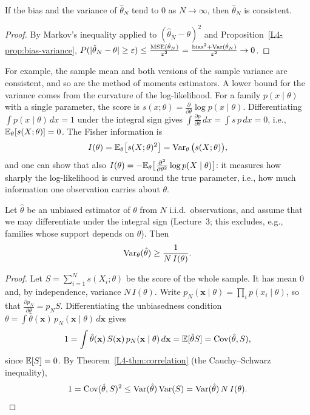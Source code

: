\begin{proposition}\label{L4-prop:consistency}
    If the bias and the variance of $\hat\theta_N$ tend to $0$ as $N \to \infty$, then $\hat\theta_N$ is consistent.
\end{proposition}

\begin{proof}
    By Markov's inequality applied to $(\hat\theta_N - \theta)^2$ and Proposition~\ref{L4-prop:bias-variance}, $P(|\hat\theta_N - \theta| \geq \varepsilon) \leq \frac{\mathrm{MSE}(\hat\theta_N)}{\varepsilon^2} = \frac{\text{bias}^2 + \operatorname{Var}(\hat\theta_N)}{\varepsilon^2} \to 0$.
\end{proof}

For example, the sample mean and both versions of the sample variance are consistent, and so are the method of moments estimators. A lower bound for the variance comes from the curvature of the log-likelihood. For a family $p(x \mid \theta)$ with a single parameter, the score is $s(x; \theta) = \frac{\partial}{\partial\theta}\log p(x \mid \theta)$. Differentiating $\int p(x \mid \theta)\, dx = 1$ under the integral sign gives $\int \frac{\partial p}{\partial\theta}\, dx = \int s\,p\, dx = 0$, i.e., $\mathbb{E}_\theta[s(X; \theta)] = 0$. The Fisher information is
\[I(\theta) = \mathbb{E}_\theta\big[s(X; \theta)^2\big] = \operatorname{Var}_\theta\big(s(X; \theta)\big),\]
and one can show that also $I(\theta) = -\mathbb{E}_\theta\big[\frac{\partial^2}{\partial\theta^2}\log p(X \mid \theta)\big]$: it measures how sharply the log-likelihood is curved around the true parameter, i.e., how much information one observation carries about $\theta$.

\begin{theorem}\label{L4-thm:cramer-rao}
    Let $\hat\theta$ be an unbiased estimator of $\theta$ from $N$ i.i.d.\ observations, and assume that we may differentiate under the integral sign (Lecture~3; this excludes, e.g., families whose support depends on $\theta$). Then
    \[\operatorname{Var}_\theta(\hat\theta) \geq \frac{1}{N\,I(\theta)}.\]
\end{theorem}

\begin{proof}
    Let $S = \sum_{i=1}^N s(X_i; \theta)$ be the score of the whole sample. It has mean $0$ and, by independence, variance $N\,I(\theta)$. Write $p_N(\mathbf{x} \mid \theta) = \prod_i p(x_i \mid \theta)$, so that $\frac{\partial p_N}{\partial\theta} = p_N S$. Differentiating the unbiasedness condition $\theta = \int \hat\theta(\mathbf{x})\,p_N(\mathbf{x} \mid \theta)\, d\mathbf{x}$ gives
    \[1 = \int \hat\theta(\mathbf{x})\,S(\mathbf{x})\,p_N(\mathbf{x} \mid \theta)\, d\mathbf{x} = \mathbb{E}[\hat\theta S] = \operatorname{Cov}(\hat\theta, S),\]
    since $\mathbb{E}[S] = 0$. By Theorem~\ref{L4-thm:correlation} (the Cauchy--Schwarz inequality),
    \[1 = \operatorname{Cov}(\hat\theta, S)^2 \leq \operatorname{Var}(\hat\theta)\operatorname{Var}(S) = \operatorname{Var}(\hat\theta)\,N\,I(\theta). \qedhere\]
\end{proof}

